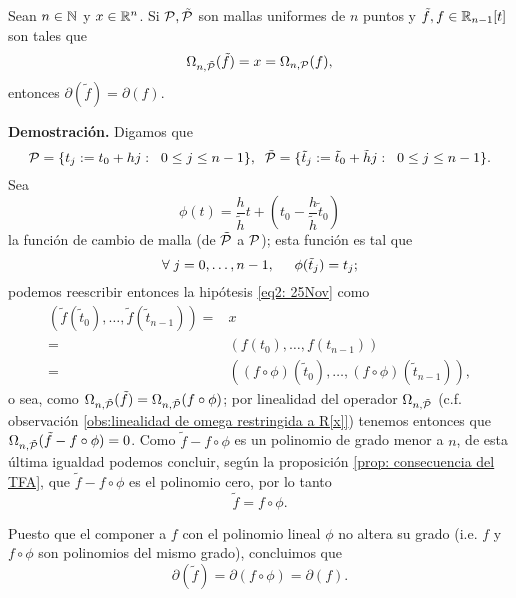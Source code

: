 \begin{prop}
\label{prop: igualdad de grado (menor a n) si dos polinomios al discretizarse dan x}
Sean $n \in \mathbb{N}$ y $x \in \mathbb{R}^{n}$.
Si $\mathcal{P}, \tilde{\mathcal{P}}$ son mallas uniformes
de $n$ puntos y $\tilde{f}, f \in \mathbb{R}_{n-1}[t]$
son tales que
\begin{equation}
\label{eq2: 25Nov}
\Omega_{n, \tilde{\mathcal{P}}}(\tilde{f})= x = 
\Omega_{n, \mathcal{P}}(f),
\end{equation}
entonces $\partial(\tilde{f})=\partial(f)$.
\end{prop}
\noindent
\textbf{Demostración.}
Digamos que 
\[
\mathcal{P}=\{t_{j}:=t_{0}+hj: \hspace{0.2cm} 0 \leq j \leq n-1 \},
\hspace{0.2cm}
\mathcal{\tilde{P}}=\{
\tilde{t}_{j}:=\tilde{t}_{0}+ \tilde{h}j: \hspace{0.2cm} 0 \leq j \leq n-1 \}.
\]
Sea 
\[
\phi(t)= \frac{h}{\tilde{h}}t+ \left( t_{0}-  \frac{h}{\tilde{h}}
\tilde{t}_{0}  \right)
\]
la función de cambio de malla
(de $\tilde{\mathcal{P}}$ a $\mathcal{P}$); esta función es 
tal que
\[
\forall \hspace{0.1cm} j = 0, \ldots, n-1, 
\hspace{0.5cm} \phi(\tilde{t}_{j})= 
t_{j};
\]
podemos reescribir entonces la hipótesis \eqref{eq2: 25Nov}
como 
\begin{align*}
(\tilde{f}(\tilde{t}_{0}), \ldots , \tilde{f}(\tilde{t}_{n-1}))
= & x \\
=& (f(t_{0}), \ldots , f(t_{n-1})) \\
=& ((f \circ \phi) (\tilde{t}_{0}), \ldots , 
(f \circ \phi) (\tilde{t}_{n-1})),
\end{align*}
o sea, como $\Omega_{n, \tilde{\mathcal{P}}}(\tilde{f})=
\Omega_{n, \tilde{\mathcal{P}}}(f \circ \phi)$; por linealidad
del operador $\Omega_{n, \tilde{\mathcal{P}}}$
(c.f. observación 
\ref{obs:linealidad de omega restringida a R[x]})
tenemos entonces que
$\Omega_{n, \tilde{\mathcal{P}}}(\tilde{f}-f \circ \phi)=0$.
Como 
$\tilde{f}-f \circ \phi$ es un polinomio de
grado menor a $n$, de esta
última igualdad podemos concluir, 
según la proposición
\ref{prop: consecuencia del TFA}, que
$\tilde{f}-f \circ \phi$
es el polinomio cero, por lo tanto
\begin{equation*}
\label{eq3: 25Nov}
\tilde{f}=f \circ \phi.
\end{equation*}

Puesto que el componer a $f$ con el polinomio lineal
$\phi$ no altera su grado (i.e. $f$ y $f \circ \phi$
son polinomios del mismo grado), concluimos que
\[
\partial(\tilde{f})= \partial(f \circ \phi)=
\partial(f).
\]
\QEDB
\vspace{0.2cm}

